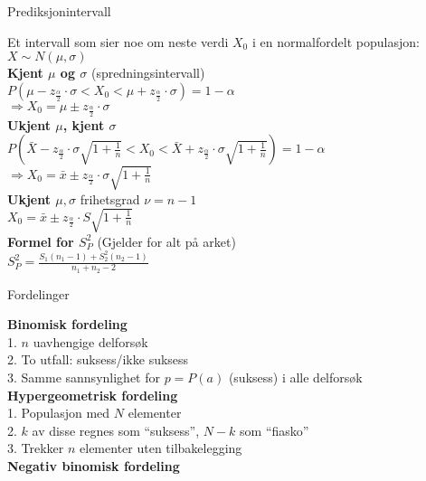 \documentclass[final,hyperref={pdfpagelabels=false}]{beamer}
\begin{document}
\begin{frame}{}
\begin{columns}[t]
		\begin{column}{.25\linewidth}
			\begin{block}{}
				\center\normalsize Prediksjonintervall\\
				{\footnotesize\raggedright
					Et intervall som sier noe om neste verdi $X_0$ i en normalfordelt populasjon: $X\sim N(\mu,\sigma)$\\
					\textbf{Kjent $\mu$ og $\sigma$} (spredningsintervall)\\
					$P\left( \mu - z_\frac{\alpha}{2} \cdot \sigma < X_0 < \mu + z_\frac{\alpha}{2} \cdot \sigma \right)=1-\alpha$\\
					$\Rightarrow X_0=\mu \pm z_\frac{\alpha}{2}\cdot \sigma$\\
					\textbf{Ukjent $\mu$, kjent $\sigma$} \\
					$P\left( \bar X - z_\frac{\alpha}{2} \cdot \sigma \sqrt{1 + \frac{1}{n}} < X_0 < \bar X + z_\frac{\alpha}{2} \cdot \sigma \sqrt{1 + \frac{1}{n}} \right)=1-\alpha$\\
					$\Rightarrow X_0=\bar x \pm z_\frac{\alpha}{2}\cdot \sigma \sqrt{1 + \frac{1}{n}}$\\
					\textbf{Ukjent $\mu, \sigma$} frihetsgrad $\nu=n-1$\\
					$X_0=\bar x \pm z_\frac{\alpha}{2} \cdot S\sqrt{1 + \frac{1}{n}}$ \\
					\textbf{Formel for $S_P^2$} (Gjelder for alt på arket) \\
					$S_P^2=\frac{S_1(n_1-1)+S_2^2(n_2-1)}{n_1 + n_2 - 2}$
				}
			\end{block}
			\begin{block}{\center\normalsize Fordelinger}
				{\footnotesize\raggedright
					\textbf{Binomisk fordeling}\\
					1. $n$ uavhengige delforsøk\\
					2. To utfall: suksess/ikke suksess\\
					3. Samme sannsynlighet for $p=P(a)$ (suksess) i alle delforsøk\\
					\textbf{Hypergeometrisk fordeling}\\
					1. Populasjon med $N$ elementer\\
					2. $k$ av disse regnes som ``suksess'', $N-k$ som ``fiasko''\\
					3. Trekker $n$ elementer uten tilbakelegging\\
					\textbf{Negativ binomisk fordeling}\\
}
\end{block}
\end{column}
\end{columns}
\end{frame}
\end{document}
